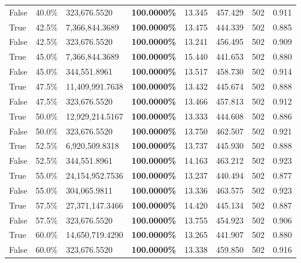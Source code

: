 \begin{table}[H]
\begin{tabular}{lllrllll}
\cline{1-8}
False & 40.0\% & 323,676.5520 & \bfseries \color{red} 100.0000\% & 13.345 & 457.429 & 502 & 0.911 \\
\cline{1-8}
True & 42.5\% & 7,366,844.3689 & \bfseries \color{red} 100.0000\% & 13.475 & 444.339 & 502 & 0.885 \\
\cline{1-8}
False & 42.5\% & 323,676.5520 & \bfseries \color{red} 100.0000\% & 13.241 & 456.495 & 502 & 0.909 \\
\cline{1-8}
True & 45.0\% & 7,366,844.3689 & \bfseries \color{red} 100.0000\% & 15.440 & 441.653 & 502 & 0.880 \\
\cline{1-8}
False & 45.0\% & 344,551.8961 & \bfseries \color{red} 100.0000\% & 13.517 & 458.730 & 502 & 0.914 \\
\cline{1-8}
True & 47.5\% & 11,409,991.7638 & \bfseries \color{red} 100.0000\% & 13.432 & 445.674 & 502 & 0.888 \\
\cline{1-8}
False & 47.5\% & 323,676.5520 & \bfseries \color{red} 100.0000\% & 13.466 & 457.813 & 502 & 0.912 \\
\cline{1-8}
True & 50.0\% & 12,929,214.5167 & \bfseries \color{red} 100.0000\% & 13.333 & 444.608 & 502 & 0.886 \\
\cline{1-8}
False & 50.0\% & 323,676.5520 & \bfseries \color{red} 100.0000\% & 13.750 & 462.507 & 502 & 0.921 \\
\cline{1-8}
True & 52.5\% & 6,920,509.8318 & \bfseries \color{red} 100.0000\% & 13.737 & 445.930 & 502 & 0.888 \\
\cline{1-8}
False & 52.5\% & 344,551.8961 & \bfseries \color{red} 100.0000\% & 14.163 & 463.212 & 502 & 0.923 \\
\cline{1-8}
True & 55.0\% & 24,154,952.7536 & \bfseries \color{red} 100.0000\% & 13.237 & 440.494 & 502 & 0.877 \\
\cline{1-8}
False & 55.0\% & 304,065.9811 & \bfseries \color{red} 100.0000\% & 13.336 & 463.575 & 502 & 0.923 \\
\cline{1-8}
True & 57.5\% & 27,371,147.3466 & \bfseries \color{red} 100.0000\% & 14.420 & 445.134 & 502 & 0.887 \\
\cline{1-8}
False & 57.5\% & 323,676.5520 & \bfseries \color{red} 100.0000\% & 13.755 & 454.923 & 502 & 0.906 \\
\cline{1-8}
True & 60.0\% & 14,650,719.4290 & \bfseries \color{red} 100.0000\% & 13.265 & 441.907 & 502 & 0.880 \\
\cline{1-8}
False & 60.0\% & 323,676.5520 & \bfseries \color{red} 100.0000\% & 13.338 & 459.850 & 502 & 0.916 \\

\end{tabular}
\end{table}
